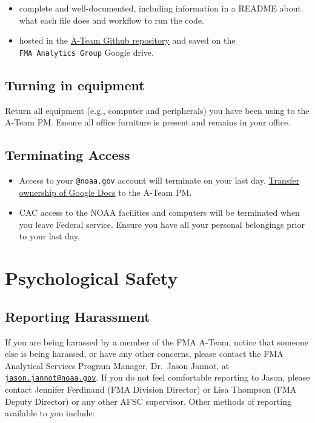 \documentclass[
  letterpaper,
  DIV=11,
  numbers=noendperiod]{scrreprt}
\providecommand{\tightlist}{%
  \setlength{\itemsep}{0pt}\setlength{\parskip}{0pt}}\usepackage{longtable,booktabs,array}
\begin{document}
\begin{itemize}
\tightlist
\item
  complete and well-documented, including information in a README about
  what each file does and workflow to run the code.
\item
  hosted in the
  \href{https://github.com/Alaska-Fisheries-Monitoring-Analytics}{A-Team
  Github repository} and saved on the \texttt{FMA\ Analytics\ Group}
  Google drive.
\end{itemize}

\section{Turning in equipment}\label{turning-in-equipment}

Return all equipment (e.g., computer and peripherals) you have been
using to the A-Team PM. Ensure all office furniture is present and
remains in your office.

\section{Terminating Access}\label{terminating-access}

\begin{itemize}
\item
  Access to your \texttt{@noaa.gov} account will terminate on your last
  day.
  \href{https://support.google.com/docs/answer/2494892?hl=en&co=GENIE.Platform\%3DDesktop}{Transfer
  ownership of Google Docs} to the A-Team PM.
\item
  CAC access to the NOAA facilities and computers will be terminated
  when you leave Federal service. Ensure you have all your personal
  belongings prior to your last day.
\end{itemize}

\cleardoublepage
{}
{}
\appendix

\chapter{Psychological Safety}\label{psych-safety}

\section{Reporting Harassment}\label{reporting-harassment-1}

If you are being harassed by a member of the FMA A-Team, notice that
someone else is being harassed, or have any other concerns, please
contact the FMA Analytical Services Program Manager, Dr.~Jason Jannot,
at
\href{mailto:jason.jannot@noaa.gov}{\nolinkurl{jason.jannot@noaa.gov}}.
If you do not feel comfortable reporting to Jason, please contact
Jennifer Ferdinand (FMA Division Director) or Lisa Thompson (FMA Deputy
Director) or any other AFSC supervisor. Other methods of reporting
available to you include:
\end{document}
